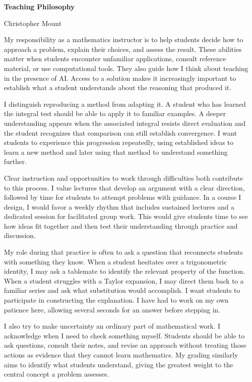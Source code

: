 \documentclass[11pt,letterpaper]{article}
\begin{document}
\begin{center}
  {\Large\bfseries Teaching Philosophy}\par
  Christopher Mount
\end{center}

My responsibility as a mathematics instructor is to help students decide how to approach a problem, explain their choices, and assess the result. These abilities matter when students encounter unfamiliar applications, consult reference material, or use computational tools. They also guide how I think about teaching in the presence of AI. Access to a solution makes it increasingly important to establish what a student understands about the reasoning that produced it.

I distinguish reproducing a method from adapting it. A student who has learned the integral test should be able to apply it to familiar examples. A deeper understanding appears when the associated integral resists direct evaluation and the student recognizes that comparison can still establish convergence. I want students to experience this progression repeatedly, using established ideas to learn a new method and later using that method to understand something further.

Clear instruction and opportunities to work through difficulties both contribute to this process. I value lectures that develop an argument with a clear direction, followed by time for students to attempt problems with guidance. In a course I design, I would favor a weekly rhythm that includes sustained lectures and a dedicated session for facilitated group work. This would give students time to see how ideas fit together and then test their understanding through practice and discussion.

My role during that practice is often to ask a question that reconnects students with something they know. When a student hesitates over a trigonometric identity, I may ask a tablemate to identify the relevant property of the function. When a student struggles with a Taylor expansion, I may direct them back to a familiar series and ask what substitution would accomplish. I want students to participate in constructing the explanation. I have had to work on my own patience here, allowing several seconds for an answer before stepping in.

I also try to make uncertainty an ordinary part of mathematical work. I acknowledge when I need to check something myself. Students should be able to ask questions, consult their notes, and revise an approach without treating those actions as evidence that they cannot learn mathematics. My grading similarly aims to identify what students understand, giving the greatest weight to the central concept a problem assesses.
\end{document}
